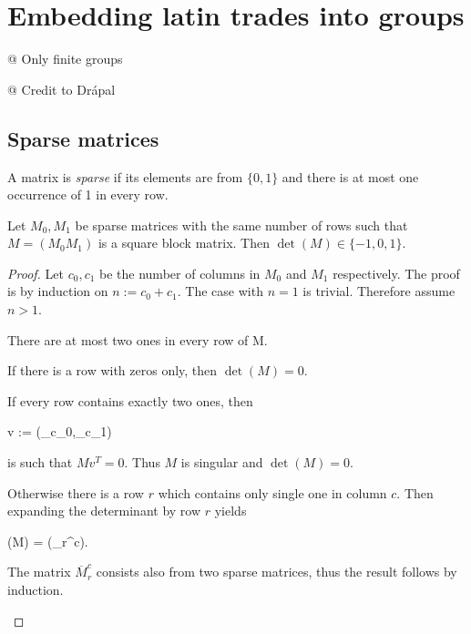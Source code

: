 \chapter{Embedding latin trades into groups}

@ Only finite groups

@ Credit to Drápal

\section{Sparse matrices}

\begin{defn}
A matrix is \emph{sparse} if its elements are from $\{0,1\}$ and there is at most one occurrence of 1 in every row.
\end{defn}

\begin{lem}
\label{lem:sparse2}
Let $M_0,M_1$ be sparse matrices with the same number of rows such that $M = (M_0M_1)$ is a square block matrix. Then $\det(M) \in \{-1,0,1\}$.
\end{lem}
\begin{proof}
Let $c_0,c_1$ be the number of columns in $M_0$ and $M_1$ respectively. The proof is by induction on $n := c_0+c_1$. The case with $n=1$ is trivial. Therefore assume $n>1$.

There are at most two ones in every row of M.
\begin{cosyitemize}
	\item If there is a row with zeros only, then $\det(M) = 0$.
	\item If every row contains exactly two ones, then
		\begin{cosyeqnarray}
			v := (_{c_0},_{c_1}) \nonumber
		\end{cosyeqnarray}%
		is such that $Mv^T = 0$. Thus $M$ is singular and $\det(M) = 0$.
	\item Otherwise there is a row $r$ which contains only single one in column $c$. Then expanding the determinant by row $r$ yields
	 \begin{cosyeqnarray}
	 	\det(M) = \pm \det(_r^c).
	 \end{cosyeqnarray}%
	The matrix $\overbar{M}_r^c$ consists also from two sparse matrices, thus the result follows by induction.
\end{cosyitemize}
\end{proof}

